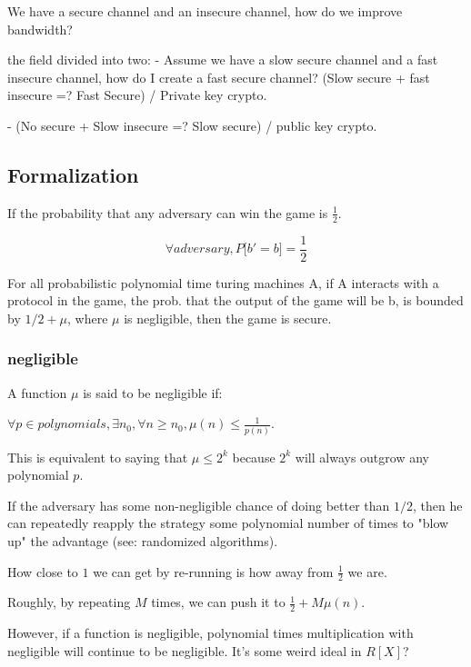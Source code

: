 We have a secure channel and an insecure channel, how do we improve 
bandwidth?

the field divided into two:
- Assume we have a slow secure channel and a fast insecure channel, how do I create
a fast secure channel? (Slow secure + fast insecure =? Fast Secure) / Private key crypto.

- (No secure + Slow insecure =? Slow secure) / public key crypto.

\subsection{Formalization}

If the probability that any adversary can win the game is $\frac{1}{2}$.

$$\forall adversary, P \lbrack b' = b \rbrack = \frac{1}{2}$$


For all probabilistic polynomial time turing machines A, if A interacts with a protocol in the game,
the prob. that the output of the game will be b, is bounded by $1 / 2 + \mu$, where $\mu$
is negligible, then the game is secure.


\subsubsection{negligible}
A function $\mu$ is said to be negligible if:


$\forall p \in polynomials, \exists n_0, \forall n \geq n_0, \mu(n) \leq \frac{1}{p(n)}$.

This is equivalent to saying that $\mu \leq 2^k$ because $2^k$ will always
outgrow any polynomial $p$.

If the adversary has some non-negligible chance of doing better than
$1 / 2$, then he can repeatedly reapply the strategy some polynomial number
of times to "blow up" the advantage (see: randomized algorithms).

How close to $1$ we can get by re-running is how away from $\frac{1}{2}$ we are.

Roughly, by repeating $M$ times, we can push it to $\frac{1}{2} + M \mu(n)$.


However, if a function is negligible, polynomial times multiplication with
negligible will continue to be negligible. It's some weird ideal in $R[X]$? 


